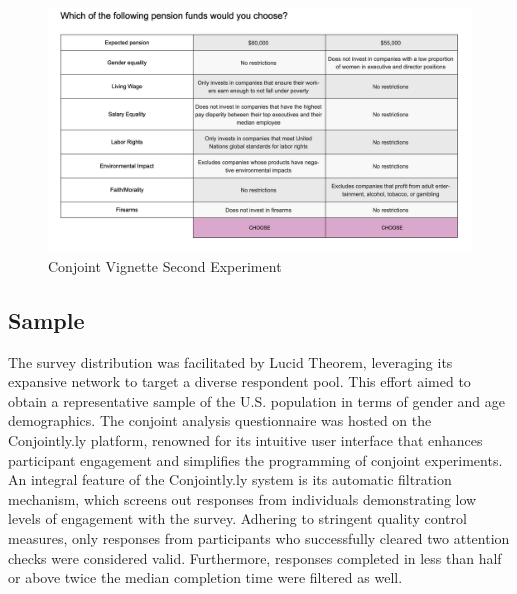 \documentclass[
  12pt,
]{article}
\begin{document}
\begin{figure}

{\centering \includegraphics{cj2} 

}

\caption{Conjoint Vignette Second Experiment}\label{fig:cj2}
\end{figure}

\hypertarget{sample}{%
\subsection{Sample}\label{sample}}

The survey distribution was facilitated by Lucid Theorem, leveraging its expansive network to target a diverse respondent pool. This effort aimed to obtain a representative sample of the U.S. population in terms of gender and age demographics. The conjoint analysis questionnaire was hosted on the Conjointly.ly platform, renowned for its intuitive user interface that enhances participant engagement and simplifies the programming of conjoint experiments. An integral feature of the Conjointly.ly system is its automatic filtration mechanism, which screens out responses from individuals demonstrating low levels of engagement with the survey. Adhering to stringent quality control measures, only responses from participants who successfully cleared two attention checks were considered valid. Furthermore, responses completed in less than half or above twice the median completion time were filtered as well.
\end{document}
